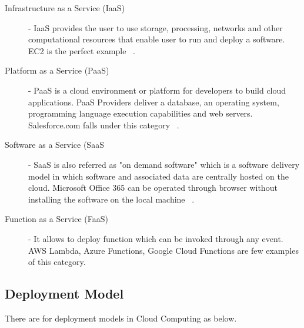 \documentclass[sigconf]{acmart}
\begin{document}
\begin{description}

\item[Infrastructure as a Service (IaaS)] - IaaS provides the user
to use storage, processing, networks and other computational resources
that enable user to run and deploy a software. EC2 is the perfect
example ~\cite{hid-sp18-513-cloud2}. 

\item[Platform as a Service (PaaS)] - PaaS is a cloud environment or
platform for developers to build cloud applications. PaaS Providers
deliver a database, an operating system, programming language execution
capabilities and web servers. Salesforce.com falls under this 
category ~\cite{hid-sp18-513-cloud2}.  

\item[Software as a Service (SaaS] - SaaS is also referred as
"on demand software" which is a software delivery model in which 
software and associated data are centrally hosted on the cloud. 
Microsoft Office 365 can be operated through browser 
without installing the software on the local machine ~\cite{hid-sp18-513-cloud2}. 

\item[Function as a Service (FaaS)] - It allows to deploy function which 
can be invoked through any event. AWS Lambda, Azure Functions, Google 
Cloud Functions are few examples of this category.
\end{description}

\subsection{Deployment Model} There are for deployment models in Cloud
Computing as below.
\end{document}
